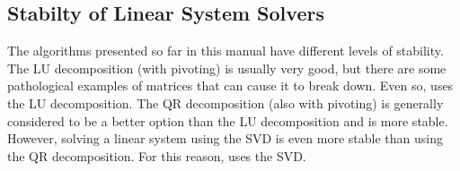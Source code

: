 \subsection*{Stabilty of Linear System Solvers} %

The algorithms presented so far in this manual have different levels of stability.
The LU decomposition (with pivoting) is usually very good, but there are some pathological examples of matrices that can cause it to break down.
Even so,  uses the LU decomposition.
The QR decomposition (also with pivoting) is generally considered to be a better option than the LU decomposition and is more stable.
However, solving a linear system using the SVD is even more stable than using the QR decomposition.
For this reason,  uses the SVD.
